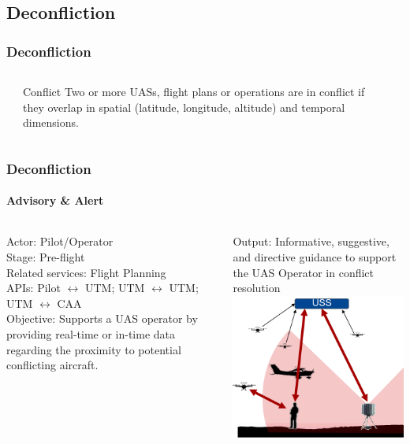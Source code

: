 \documentclass[usenames,dvipsnames,aspectratio=169,serif]{beamer}
\begin{document}
\subsection{Deconfliction}

\begin{frame}
   \frametitle{Deconfliction}
   \begin{columns}[t]
      \begin{column}{0.25\textwidth}
      \end{column}
      \begin{column}{0.5\textwidth}
         \begin{block}{Conflict}
            Two or more UASs, flight plans or operations are in conflict if they overlap in spatial (latitude, longitude, altitude) and temporal dimensions.
         \end{block}
      \end{column}
      \begin{column}{0.25\textwidth}
      \end{column}
   \end{columns}
\end{frame}

\begin{frame}
   \frametitle{Deconfliction}
   \framesubtitle{Advisory \& Alert}
   \begin{columns}[t]
      \begin{column}{0.5\textwidth}
         Actor: Pilot/Operator \\
         Stage: Pre-flight \\
         Related services: Flight Planning \\
         APIs: Pilot $\leftrightarrow$ UTM; UTM $\leftrightarrow$ UTM; UTM $\leftrightarrow$ CAA \\
         Objective: Supports a UAS operator by providing real-time or in-time data regarding the proximity to potential conflicting aircraft.
      \end{column}
      \begin{column}{0.5\textwidth}
         Output: Informative, suggestive, and directive guidance to support the UAS Operator in conflict resolution \\
         \includegraphics[height=0.45\textwidth]{img/conflict-advisory.png}

      \end{column}
   \end{columns}
\end{frame}
\end{document}
